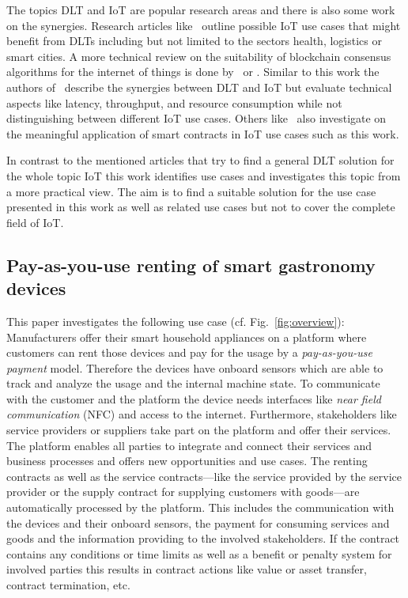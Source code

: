 \documentclass[conference]{IEEEtran}
\begin{document}
The topics DLT and IoT are popular research areas and there is also some work on the synergies. Research articles like~\cite{Review2018} outline possible IoT use cases that might benefit from DLTs including but not limited to the sectors health, logistics or smart cities. A more technical review on the suitability of blockchain consensus algorithms for the internet of things is done by~\cite{Salimitari2020} or \cite{Eval2018}. Similar to this work the authors of~\cite{convergence2019} describe the synergies between DLT and IoT but evaluate technical aspects like latency, throughput, and resource consumption while not distinguishing between different IoT use cases. Others like~\cite{SCIOT2016} also investigate on the meaningful application of smart contracts in IoT use cases such as this work.

In contrast to the mentioned articles that try to find a general DLT solution for the whole topic IoT this work identifies use cases and investigates this topic from a more practical view. The aim is to find a suitable solution for the use case presented in this work as well as related use cases but not to cover the complete field of IoT.

%
\subsection{Pay-as-you-use renting of smart gastronomy devices}

This paper investigates the following use case (cf. Fig.~\ref{fig:overview}): Manufacturers offer their smart household appliances on a platform where customers can rent those devices and pay for the usage by a \emph{pay-as-you-use payment} model. Therefore the devices have onboard sensors which are able to track and analyze the usage and the internal machine state. To communicate with the customer and the platform the device needs interfaces like \emph{near field communication} (NFC) and access to the internet. Furthermore, stakeholders like service providers or suppliers take part on the platform and offer their services. The platform enables all parties to integrate and connect their services and business processes and offers new opportunities and use cases. The renting contracts as well as the service contracts---like the service provided by the service provider or the supply contract for supplying customers with goods---are automatically processed by the platform. This includes the communication with the devices and their onboard sensors, the payment for consuming services and goods and the information providing to the involved stakeholders. If the contract contains any conditions or time limits as well as a benefit or penalty system for involved parties this results in contract actions like value or asset transfer, contract termination, etc.
\end{document}
